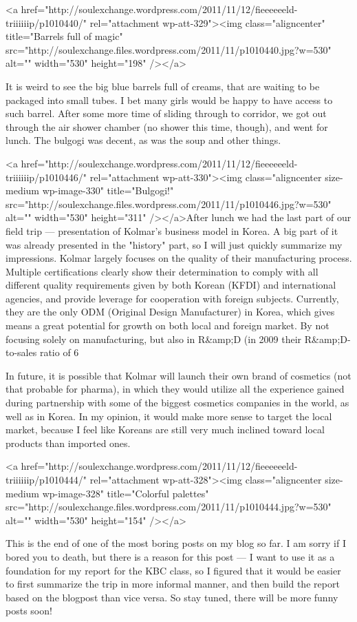 \begin{post}
\begin{content}
<a href="http://soulexchange.wordpress.com/2011/11/12/fieeeeeeld-triiiiiip/p1010440/" rel="attachment wp-att-329"><img class="aligncenter" title="Barrels full of magic" src="http://soulexchange.files.wordpress.com/2011/11/p1010440.jpg?w=530" alt="" width="530" height="198" /></a>

It is weird to see the big blue barrels full of creams, that are waiting to be packaged into small tubes. I bet many girls would be happy to have access to such barrel. After some more time of sliding through to corridor, we got out through the air shower chamber (no shower this time, though), and went for lunch. The bulgogi was decent, as was the soup and other things.

<a href="http://soulexchange.wordpress.com/2011/11/12/fieeeeeeld-triiiiiip/p1010446/" rel="attachment wp-att-330"><img class="aligncenter size-medium wp-image-330" title="Bulgogi!" src="http://soulexchange.files.wordpress.com/2011/11/p1010446.jpg?w=530" alt="" width="530" height="311" /></a>After lunch we had the last part of our field trip — presentation of Kolmar's business model in Korea. A big part of it was already presented in the "history" part, so I will just quickly summarize my impressions. Kolmar largely focuses on the quality of their manufacturing process. Multiple certifications clearly show their determination to comply with all different quality requirements given by both Korean (KFDI) and international agencies, and provide leverage for cooperation with foreign subjects. Currently, they are the only ODM (Original Design Manufacturer) in Korea, which gives means a great potential for growth on both local and foreign market. By not focusing solely on manufacturing, but also in R&amp;D (in 2009 their R&amp;D-to-sales ratio of 6%

In future, it is possible that Kolmar will launch their own brand of cosmetics (not that probable for pharma), in which they would utilize all the experience gained during partnership with some of the biggest cosmetics companies in the world, as well as in Korea. In my opinion, it would make more sense to target the local market, because I feel like Koreans are still very much inclined toward local products than imported ones.

<a href="http://soulexchange.wordpress.com/2011/11/12/fieeeeeeld-triiiiiip/p1010444/" rel="attachment wp-att-328"><img class="aligncenter size-medium wp-image-328" title="Colorful palettes" src="http://soulexchange.files.wordpress.com/2011/11/p1010444.jpg?w=530" alt="" width="530" height="154" /></a>

This is the end of one of the most boring posts on my blog so far. I am sorry if I bored you to death, but there is a reason for this post — I want to use it as a foundation for my report for the KBC class, so I figured that it would be easier to first summarize the trip in more informal manner, and then build the report based on the blogpost than vice versa. So stay tuned, there will be more funny posts soon!
	\end{content}
\end{post}

